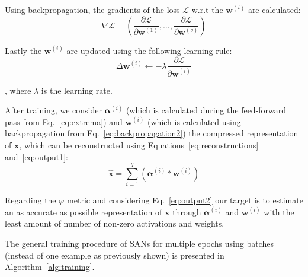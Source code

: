 \documentclass[journal]{IEEEtran}
\begin{document}
Using backpropagation, the gradients of the loss $\mathcal{L}$ w.r.t the $\bm{w}^{(i)}$ are calculated:
\begin{equation}
  \label{eq:backpropagation1}
  \nabla\mathcal{L} = \left( \frac{\partial\mathcal{L}}{\partial\bm{w}^{(1)}},\ldots,\frac{\partial\mathcal{L}}{\partial\bm{w}^{(q)}}\right)
\end{equation}

Lastly the $\bm{w}^{(i)}$ are updated using the following learning rule:
\begin{equation}
  \label{eq:backpropagation2}
  \Delta\bm{w}^{(i)} \leftarrow -\lambda\frac{\partial\mathcal{L}}{\partial\bm{w}^{(i)}}
\end{equation}

\noindent
, where $\lambda$ is the learning rate.

After training, we consider $\bm{\alpha}^{(i)}$ (which is calculated during the feed-forward pass from Eq.~\ref{eq:extrema}) and $\bm{w}^{(i)}$ (which is calculated using backpropagation from Eq.~\ref{eq:backpropagation2}) the compressed representation of $\bm{x}$, which can be reconstructed using Equations~\ref{eq:reconstructions} and~\ref{eq:output1}:
\begin{equation}
  \label{eq:output2}
  \hat{\bm{x}} = \sum\limits_{i=1}^q \left(\bm{\alpha}^{(i)} * \bm{w}^{(i)}\right)
\end{equation}

Regarding the $\varphi$ metric and considering Eq.~\ref{eq:output2} our target is to estimate an as accurate as possible representation of $\bm{x}$ through $\bm{\alpha}^{(i)}$ and $\bm{w}^{(i)}$ with the least amount of number of non-zero activations and weights.

The general training procedure of SANs for multiple epochs using batches (instead of one example as previously shown) is presented in Algorithm~\ref{alg:training}.
\end{document}
